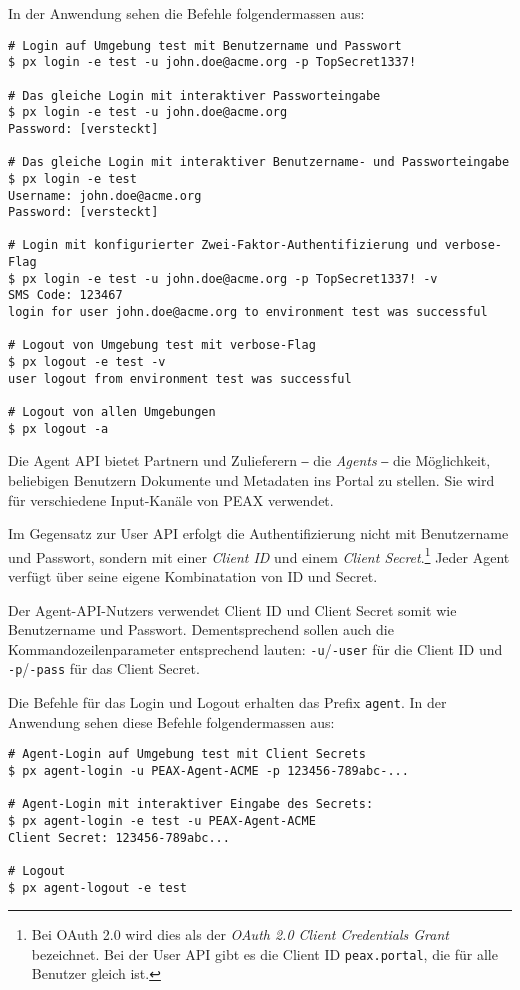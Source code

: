 In der Anwendung sehen die Befehle folgendermassen aus:

\begin{lstlisting}[caption={Anwendung der Befehle für Login und Logout}]
# Login auf Umgebung test mit Benutzername und Passwort
$ px login -e test -u john.doe@acme.org -p TopSecret1337!

# Das gleiche Login mit interaktiver Passworteingabe
$ px login -e test -u john.doe@acme.org
Password: [versteckt]

# Das gleiche Login mit interaktiver Benutzername- und Passworteingabe
$ px login -e test
Username: john.doe@acme.org
Password: [versteckt]

# Login mit konfigurierter Zwei-Faktor-Authentifizierung und verbose-Flag
$ px login -e test -u john.doe@acme.org -p TopSecret1337! -v
SMS Code: 123467
login for user john.doe@acme.org to environment test was successful

# Logout von Umgebung test mit verbose-Flag
$ px logout -e test -v
user logout from environment test was successful

# Logout von allen Umgebungen
$ px logout -a
\end{lstlisting}

Die Agent API bietet Partnern und Zulieferern ‒ die \textit{Agents} ‒ die Möglichkeit, beliebigen Benutzern Dokumente und Metadaten ins Portal zu stellen. Sie wird für verschiedene Input-Kanäle von PEAX verwendet.

Im Gegensatz zur User API erfolgt die Authentifizierung nicht mit Benutzername und Passwort, sondern mit einer \textit{Client ID} und einem \textit{Client Secret}.\footnote{Bei OAuth 2.0 wird dies als der \textit{OAuth 2.0 Client Credentials Grant} bezeichnet. Bei der User API gibt es die Client ID \texttt{peax.portal}, die für alle Benutzer gleich ist.} Jeder Agent verfügt über seine eigene Kombinatation von ID und Secret.

Der Agent-API-Nutzers verwendet Client ID und Client Secret somit wie Benutzername und Passwort. Dementsprechend sollen auch die Kommandozeilenparameter entsprechend lauten: \texttt{-u}/\texttt{-user} für die Client ID und \texttt{-p}/\texttt{-pass} für das Client Secret.

Die Befehle für das Login und Logout erhalten das Prefix \texttt{agent}. In der Anwendung sehen diese Befehle folgendermassen aus:

\begin{lstlisting}[caption={Anwendung der Befehle für Agent-Login und -Logout}]
# Agent-Login auf Umgebung test mit Client Secrets
$ px agent-login -u PEAX-Agent-ACME -p 123456-789abc-...

# Agent-Login mit interaktiver Eingabe des Secrets:
$ px agent-login -e test -u PEAX-Agent-ACME
Client Secret: 123456-789abc...

# Logout
$ px agent-logout -e test
\end{lstlisting}

